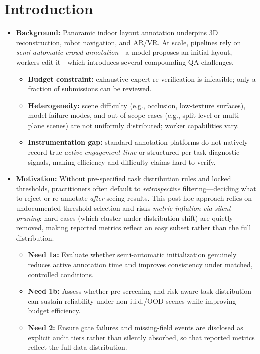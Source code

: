 \section{Introduction}
\label{sec:introduction}

\begin{itemize}

  \item \textbf{Background:}
  Panoramic indoor layout annotation underpins 3D reconstruction, robot navigation, and AR/VR.
  At scale, pipelines rely on \emph{semi-automatic crowd annotation}---a model proposes an initial
  layout, workers edit it---which introduces several compounding QA challenges.
  \begin{itemize}
    \item \textbf{Budget constraint:} exhaustive expert re-verification is infeasible; only a fraction of submissions can be reviewed.
    \item \textbf{Heterogeneity:} scene difficulty (e.g., occlusion, low-texture surfaces), model failure modes, and out-of-scope cases (e.g., split-level or multi-plane scenes) are not uniformly distributed; worker capabilities vary.
    \item \textbf{Instrumentation gap:} standard annotation platforms do not natively record true \emph{active engagement time} or structured per-task diagnostic signals, making efficiency and difficulty claims hard to verify.
  \end{itemize}

  \item \textbf{Motivation:}
  Without pre-specified task distribution rules and locked thresholds, practitioners often default to
  \emph{retrospective} filtering---deciding what to reject or re-annotate \emph{after} seeing results.
  This post-hoc approach relies on undocumented threshold selection and risks
  \emph{metric inflation via silent pruning}: hard cases (which cluster under distribution shift)
  are quietly removed, making reported metrics reflect an easy subset rather than the full distribution.
  \begin{itemize}
    \item \textbf{Need 1a:} Evaluate whether semi-automatic initialization genuinely reduces active annotation time and improves consistency under matched, controlled conditions.
    \item \textbf{Need 1b:} Assess whether pre-screening and risk-aware task distribution can sustain reliability under non-i.i.d./OOD scenes while improving budget efficiency.
    \item \textbf{Need 2:} Ensure gate failures and missing-field events are disclosed as explicit audit tiers rather than silently absorbed, so that reported metrics reflect the full data distribution.
  \end{itemize}


\end{itemize}
